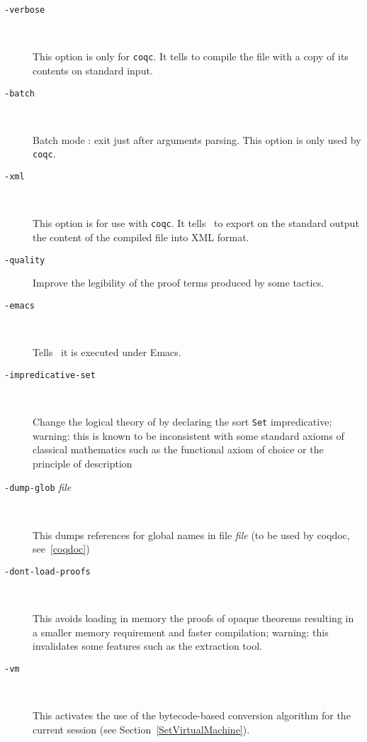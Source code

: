 \begin{description}
\item[{\tt -verbose}]\ 

  This option is only for {\tt coqc}. It tells to compile the file with
  a copy of its contents on standard input.

\item[{\tt -batch}]\ 

  Batch mode : exit just after arguments parsing. This option is only
  used by {\tt coqc}.

%

\item[{\tt -xml}]\ 

  This option is for use with {\tt coqc}. It tells \Coq\ to export on
  the standard output the content of the compiled file into XML format.

\item[{\tt -quality}]

  Improve the legibility of the proof terms produced by some tactics.

\item[{\tt -emacs}]\ 

  Tells \Coq\ it is executed under Emacs.

\item[{\tt -impredicative-set}]\ 

  Change the logical theory of {\Coq} by declaring the sort {\tt Set}
  impredicative; warning: this is known to be inconsistent with
  some standard axioms of classical mathematics such as the functional
  axiom of choice or the principle of description

\item[{\tt -dump-glob} {\em file}]\

  This dumps references for global names in file {\em file}
  (to be used by coqdoc, see~\ref{coqdoc})
 
\item[{\tt -dont-load-proofs}]\ 

  This avoids loading in memory the proofs of opaque theorems
  resulting in a smaller memory requirement and faster compilation;
  warning: this invalidates some features such as the extraction tool.

\item[{\tt -vm}]\ 

  This activates the use of the bytecode-based conversion algorithm
  for the current session (see Section~\ref{SetVirtualMachine}).


\end{description}
